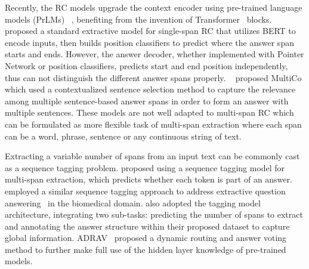 Recently, the RC models upgrade the context encoder using pre-trained language models (PrLMs)~\citep{radford2018improving,kenton2019bert,liu2019roberta,lee2020biobert,gu2021domain} 
, benefiting from the invention of Transformer~\citep{vaswani2017attention} blocks.
\cite{DBLP:conf/naacl/DevlinCLT19}  proposed a standard extractive model for  single-span RC that utilizes BERT to encode inputs, then builds position classifiers to predict where the answer span starts and ends.
However, the answer decoder, whether implemented with Pointer Network or position classifiers, predicts start and end position independently, thus can not distinguish the different answer spans properly.
~\cite{DBLP:conf/emnlp/ZhuAJ0R20} proposed MultiCo which used a contextualized sentence selection method to capture the relevance among multiple sentence-based answer spans in order to form an answer with multiple sentences.
These models are not well adapted to multi-span RC which can be formulated as more flexible task of multi-span extraction where each span can be a word, phrase, sentence or any continuous string of text.

Extracting a variable number of spans from an input text can be commonly cast as a sequence tagging problem.
\cite{segal2020simple} proposed using a sequence tagging model for multi-span extraction, which predicts whether each token is part of an answer. \cite{yoon2022} employed a similar sequence tagging approach to address extractive question answering~\citep{DBLP:journals/bmcbi/NaseemDKK22}  in the biomedical domain.
\cite{li2022multispanqa} also adopted the tagging model architecture, integrating two sub-tasks: predicting the number of spans to extract and annotating the answer structure within their proposed dataset to capture global information.
ADRAV~\citep{hu2023biomedical} proposed a dynamic routing and answer voting method to further make full use of the hidden layer knowledge of pre-trained models.

